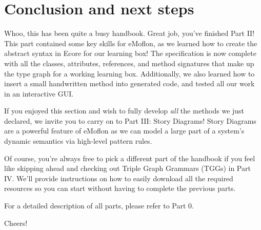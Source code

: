 \newpage
\section{Conclusion and next steps}
\genHeader

\vspace{0.5cm}

Whoo, this has been quite a busy handbook. Great job, you've finished Part II! This part contained some key skills for eMoflon, as we learned how to create
the abstract syntax in Ecore for our learning box! The specification is now complete with all the classes, attributes, references, and
method signatures that make up the type graph for a working learning box. Additionally, we also learned how to insert a small handwritten method into generated
code, and tested all our work in an interactive GUI.

If you enjoyed this section and wish to fully develop \emph{all} the methods we just declared, we invite you to carry on to Part III: Story
Diagrams! Story Diagrams are a powerful feature of eMoflon as we can model a large part of a system's dynamic semantics via high-level pattern rules. 


Of course, you're always free to pick a different part of the handbook if you feel like skipping ahead and checking out Triple Graph Grammars (TGGs) in Part IV. 
We'll provide instructions on how to easily download all the required resources so you can start without having to complete the previous parts.

For a detailed description of all parts, please refer to Part 0.

\vspace{1.0cm}

Cheers!